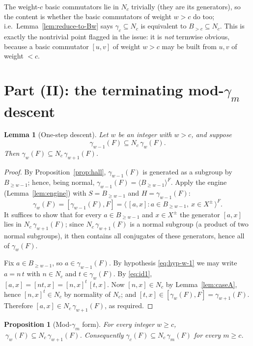 \documentclass{amsart}
\newtheorem{lemma}{Lemma}
\newtheorem{proposition}{Proposition}
\theoremstyle{definition}
\theoremstyle{remark}
\begin{document}
\noindent
The weight-$c$ basic commutators lie in $N_c$ trivially (they are its generators),
so the content is whether the basic commutators of weight $w>c$ do too; i.e.\
Lemma~\ref{lem:reduce-to-Bw} says $\gamma_c\subseteq N_c$ is equivalent to
$B_{>c}\subseteq N_c$. This is exactly the nontrivial point flagged in the issue:
it is \emph{not} termwise obvious, because a basic commutator $[u,v]$ of weight
$w>c$ may be built from $u,v$ of weight $<c$.

\section{Part (II): the terminating mod-$\gamma_m$ descent}\label{sec:moddescent}

\begin{lemma}[One-step descent]\label{lem:onestep}
Let $w$ be an integer with $w>c$, and suppose
\begin{equation}\label{eq:hyp-w-1}
\gamma_{w-1}(F)\subseteq N_c\,\gamma_{w}(F).
\end{equation}
Then $\gamma_{w}(F)\subseteq N_c\,\gamma_{w+1}(F)$.
\end{lemma}

\begin{proof}
By Proposition~\ref{prop:hall}, $\gamma_{w-1}(F)$ is generated as a subgroup by
$B_{\ge w-1}$; hence, being normal, $\gamma_{w-1}(F)=\langle
B_{\ge w-1}\rangle^{F}$. Apply the engine (Lemma~\ref{lem:engine}) with
$S=B_{\ge w-1}$ and $H=\gamma_{w-1}(F)$:
\[
\gamma_w(F)=[\gamma_{w-1}(F),F]
=\big\langle\,[a,x] : a\in B_{\ge w-1},\ x\in X^{\pm}\,\big\rangle^{F}.
\]
It suffices to show that for every $a\in B_{\ge w-1}$ and $x\in X^{\pm}$ the
generator $[a,x]$ lies in $N_c\,\gamma_{w+1}(F)$; since $N_c\,\gamma_{w+1}(F)$ is a
normal subgroup (a product of two normal subgroups), it then contains all
conjugates of these generators, hence all of $\gamma_w(F)$.

Fix $a\in B_{\ge w-1}$, so $a\in\gamma_{w-1}(F)$. By hypothesis
\eqref{eq:hyp-w-1} we may write $a=n\,t$ with $n\in N_c$ and $t\in\gamma_w(F)$.
By \eqref{eq:id1}, $[a,x]=[nt,x]=[n,x]^{t}\,[t,x]$. Now $[n,x]\in N_c$ by
Lemma~\ref{lem:caseA}, hence $[n,x]^{t}\in N_c$ by normality of $N_c$; and
$[t,x]\in[\gamma_w(F),F]=\gamma_{w+1}(F)$. Therefore $[a,x]\in
N_c\,\gamma_{w+1}(F)$, as required.
\end{proof}

\begin{proposition}[Mod-$\gamma_m$ form]\label{prop:moddescent}
For every integer $w\ge c$, $\ \gamma_w(F)\subseteq N_c\,\gamma_{w+1}(F)$.
Consequently $\gamma_c(F)\subseteq N_c\,\gamma_m(F)$ for every $m\ge c$.
\end{proposition}
\end{document}
